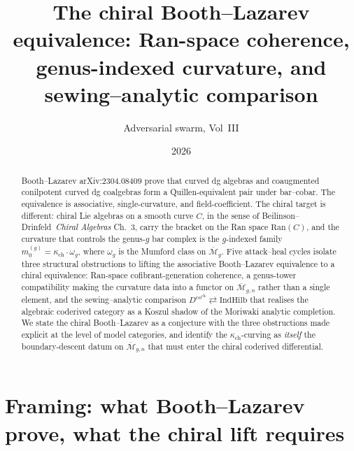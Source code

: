 \documentclass[11pt]{amsart}
\newcommand{\kch}{\kappa_{\mathrm{ch}}}
\newcommand{\cM}{\mathcal{M}}
\newcommand{\Ran}{\mathrm{Ran}}
\newcommand{\Dco}{D^{\mathrm{co}}}
\newcommand{\IndHilb}{\mathrm{IndHilb}}
\newcommand{\Mbar}{\overline{\cM}}
\begin{document}
\title{The chiral Booth--Lazarev equivalence: Ran-space coherence,
genus-indexed curvature, and sewing--analytic comparison}
\author{Adversarial swarm, Vol~III}
\date{2026}
\maketitle

\begin{abstract}
Booth--Lazarev arXiv:$2304.08409$ prove that curved dg algebras and
coaugmented conilpotent curved dg coalgebras form a Quillen-equivalent
pair under bar--cobar. The equivalence is associative, single-curvature,
and field-coefficient. The chiral target is different: chiral Lie
algebras on a smooth curve $C$, in the sense of
Beilinson--Drinfeld~\emph{Chiral Algebras} Ch.~3, carry the bracket on
the Ran space $\Ran(C)$, and the curvature that controls the genus-$g$
bar complex is the $g$-indexed family
$m_0^{(g)}=\kch\cdot\omega_g$, where $\omega_g$ is the Mumford class on
$\Mbar_g$. Five attack--heal cycles isolate three structural
obstructions to lifting the associative Booth--Lazarev equivalence to
a chiral equivalence: Ran-space cofibrant-generation coherence, a
genus-tower compatibility making the curvature data into a functor on
$\Mbar_{g,n}$ rather than a single element, and the
sewing--analytic comparison $\Dco^{\mathrm{ch}}\rightleftarrows
\IndHilb$ that realises the algebraic coderived category as a
Koszul shadow of the Moriwaki analytic completion. We state the
chiral Booth--Lazarev as a conjecture with the three obstructions
made explicit at the level of model categories, and identify the
$\kch$-curving as \emph{itself} the boundary-descent datum on
$\Mbar_{g,n}$ that must enter the chiral coderived differential.
\end{abstract}

\tableofcontents

\section{Framing: what Booth--Lazarev prove, what the chiral lift
requires}
\label{sec:framing}
\end{document}
